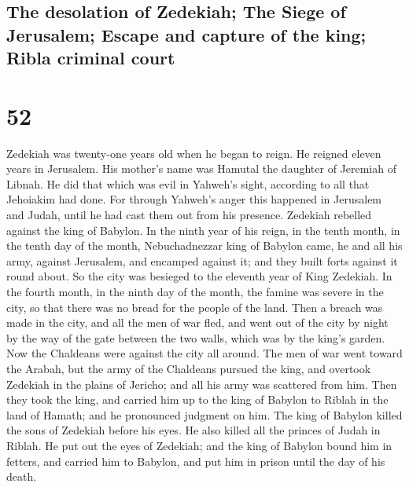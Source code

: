 \begin{paracol}{2}
\begin{otherlanguage}{english}
\hypertarget{the-desolation-of-zedekiah-the-siege-of-jerusalem-escape-and-capture-of-the-king-ribla-criminal-court}{%
\subsection{The desolation of Zedekiah; The Siege of Jerusalem; Escape
and capture of the king; Ribla criminal
court}\label{the-desolation-of-zedekiah-the-siege-of-jerusalem-escape-and-capture-of-the-king-ribla-criminal-court}}

\hypertarget{section-103}{%
\section{52}\label{section-103}}

 Zedekiah was twenty-one years old when he began to reign.
He reigned eleven years in Jerusalem. His mother's name was Hamutal the
daughter of Jeremiah of Libnah.  He did that which was
evil in Yahweh's sight, according to all that Jehoiakim had done.
 For through Yahweh's anger this happened in Jerusalem and
Judah, until he had cast them out from his presence. Zedekiah rebelled
against the king of Babylon.  In the ninth year of his
reign, in the tenth month, in the tenth day of the month, Nebuchadnezzar
king of Babylon came, he and all his army, against Jerusalem, and
encamped against it; and they built forts against it round about.
 So the city was besieged to the eleventh year of King
Zedekiah.  In the fourth month, in the ninth day of the
month, the famine was severe in the city, so that there was no bread for
the people of the land.  Then a breach was made in the
city, and all the men of war fled, and went out of the city by night by
the way of the gate between the two walls, which was by the king's
garden. Now the Chaldeans were against the city all around. The men of
war went toward the Arabah,  but the army of the Chaldeans
pursued the king, and overtook Zedekiah in the plains of Jericho; and
all his army was scattered from him.  Then they took the
king, and carried him up to the king of Babylon to Riblah in the land of
Hamath; and he pronounced judgment on him.  The king of
Babylon killed the sons of Zedekiah before his eyes. He also killed all
the princes of Judah in Riblah.  He put out the eyes of
Zedekiah; and the king of Babylon bound him in fetters, and carried him
to Babylon, and put him in prison until the day of his death.


\end{otherlanguage}
\end{paracol}
